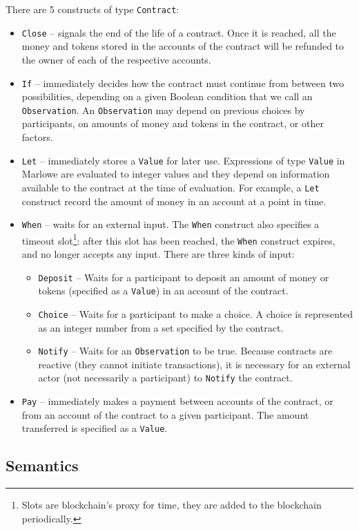 \documentclass[english,runningheads]{llncs}
\begin{document}
There are 5 constructs of type \texttt{Contract}:
\begin{itemize}
\item \texttt{Close} -- signals the end of the life of a contract. Once
it is reached, all the money and tokens stored in the accounts of
the contract will be refunded to the owner of each of the respective
accounts.
\item \texttt{If} -- immediately decides how the contract must continue
from between two possibilities, depending on a given Boolean condition
that we call an \texttt{Observation}. An \texttt{Observation}
may depend on previous choices by participants, on amounts of money
and tokens in the contract, or other factors.
\item \texttt{Let} -- immediately stores a \texttt{Value} for later use.
Expressions of type \texttt{Value} in Marlowe are evaluated to integer
values and they depend on information available to the contract at the
time of evaluation. For example, a \texttt{Let} construct record
the amount of money in an account at a point in time.
\item \texttt{When} -- waits for an external input. The \texttt{When} construct
also specifies a timeout slot\footnote{Slots are blockchain's proxy for time,
they are added to the blockchain periodically.}: after this slot has been reached, the
\texttt{When} construct expires, and no longer accepts any input.
There are three kinds of input:
\begin{itemize}
\item \texttt{Deposit} -- Waits for a participant to deposit an amount
of money or tokens (specified as a \texttt{Value}) in an account of the contract.
\item \texttt{Choice} -- Waits for a participant to make a choice. A choice
is represented as an integer number from a set specified by the contract.
\item \texttt{Notify} -- Waits for an \texttt{Observation} to be true.
Because contracts are reactive (they cannot initiate transactions),
it is necessary for an external actor (not necessarily a participant)
to \texttt{Notify} the contract.
\end{itemize}
\item \texttt{Pay} -- immediately makes a payment between accounts of the
contract, or from an account of the contract to a given participant.
The amount transferred is specified as a \texttt{Value}.
\end{itemize}

\subsection{Semantics\label{subsec:Marlowe-Semantics}}
\end{document}
